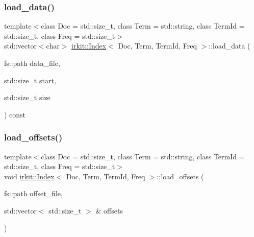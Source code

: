 \subsubsection{\texorpdfstring{load\+\_\+data()}{load\_data()}\hspace{0.1cm}{\footnotesize\ttfamily [2/2]}}
{\footnotesize\ttfamily template$<$class Doc  = std\+::size\+\_\+t, class Term  = std\+::string, class Term\+Id  = std\+::size\+\_\+t, class Freq  = std\+::size\+\_\+t$>$ \\
std\+::vector$<$char$>$ \hyperlink{classirkit_1_1Index}{irkit\+::\+Index}$<$ Doc, Term, Term\+Id, Freq $>$\+::load\+\_\+data (\begin{DoxyParamCaption}\item[{fs\+::path}]{data\+\_\+file,  }\item[{std\+::size\+\_\+t}]{start,  }\item[{std\+::size\+\_\+t}]{size }\end{DoxyParamCaption}) const\hspace{0.3cm}{\ttfamily [inline]}}

\mbox{\label{classirkit_1_1Index_a1d44636a2174a740a9e648d2587254a6}} 
\subsubsection{\texorpdfstring{load\+\_\+offsets()}{load\_offsets()}}
{\footnotesize\ttfamily template$<$class Doc  = std\+::size\+\_\+t, class Term  = std\+::string, class Term\+Id  = std\+::size\+\_\+t, class Freq  = std\+::size\+\_\+t$>$ \\
void \hyperlink{classirkit_1_1Index}{irkit\+::\+Index}$<$ Doc, Term, Term\+Id, Freq $>$\+::load\+\_\+offsets (\begin{DoxyParamCaption}\item[{fs\+::path}]{offset\+\_\+file,  }\item[{std\+::vector$<$ std\+::size\+\_\+t $>$ \&}]{offsets }\end{DoxyParamCaption})\hspace{0.3cm}{\ttfamily [inline]}}

\mbox{\label{classirkit_1_1Index_af8a4dd64292b2b7f7359ef1e62d75147}} 
